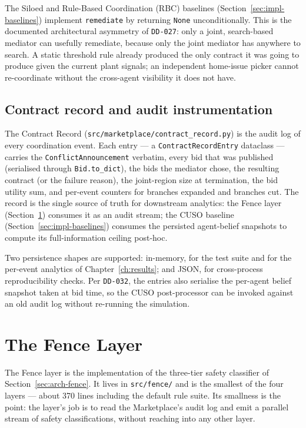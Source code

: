 The Siloed and Rule-Based Coordination (RBC) baselines
(Section~\ref{sec:impl-baselines}) implement \texttt{remediate} by
returning \texttt{None} unconditionally.
This is the documented architectural asymmetry of \texttt{DD-027}: only
a joint, search-based mediator can usefully remediate, because only the
joint mediator has anywhere to search. A static threshold rule already
produced the only contract it was going to produce given the current
plant signals; an independent home-issue picker cannot re-coordinate
without the cross-agent visibility it does not have.

\subsection{Contract record and audit instrumentation}
\label{subsec:impl-record}

The Contract Record (\texttt{src/marketplace/contract\_record.py}) is
the audit log of every coordination event. Each entry --- a
\texttt{ContractRecordEntry} dataclass --- carries the
\texttt{ConflictAnnouncement} verbatim, every bid that was published
(serialised through \texttt{Bid.to\_dict}), the bids the mediator
chose, the resulting contract (or the failure reason), the
joint-region size at termination, the bid utility sum, and per-event
counters for branches expanded and branches cut. The record is the
single source of truth for downstream analytics: the Fence layer
(Section~\ref{sec:impl-fence}) consumes it as an audit stream; the CUSO
baseline (Section~\ref{sec:impl-baselines}) consumes the persisted
agent-belief snapshots to compute its full-information ceiling
post-hoc.

Two persistence shapes are supported: in-memory, for the test suite and
for the per-event analytics of Chapter~\ref{ch:results}; and JSON, for
cross-process reproducibility checks. Per \texttt{DD-032}, the entries
also serialise the per-agent belief snapshot taken at bid time, so the
CUSO post-processor can be invoked against an old audit log without
re-running the simulation.

\section{The Fence Layer}
\label{sec:impl-fence}

The Fence layer is the implementation of the three-tier safety
classifier of Section~\ref{sec:arch-fence}. It lives in
\texttt{src/fence/} and is the smallest of the four layers ---
about 370 lines including the default rule suite. Its smallness is the
point: the layer's job is to read the Marketplace's audit log and
emit a parallel stream of safety classifications, without reaching into
any other layer.

